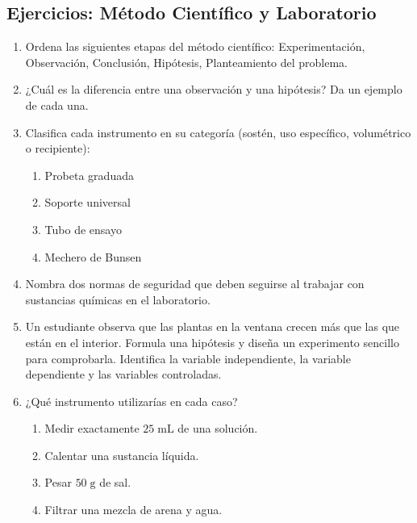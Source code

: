 \documentclass[12pt, letterpaper]{article}
\begin{document}
\newpage

\subsection{Ejercicios: Método Científico y Laboratorio}

\begin{enumerate}[leftmargin=*]
  \item \facil{} Ordena las siguientes etapas del método científico: Experimentación, Observación, Conclusión, Hipótesis, Planteamiento del problema.

  \item \facil{} ¿Cuál es la diferencia entre una observación y una hipótesis? Da un ejemplo de cada una.

  \item \facil{} Clasifica cada instrumento en su categoría (sostén, uso específico, volumétrico o recipiente):
        \begin{enumerate}[label=\alph*)]
          \item Probeta graduada
          \item Soporte universal
          \item Tubo de ensayo
          \item Mechero de Bunsen
        \end{enumerate}

  \item \facil{} Nombra dos normas de seguridad que deben seguirse al trabajar con sustancias químicas en el laboratorio.

  \item \medio{} Un estudiante observa que las plantas en la ventana crecen más que las que están en el interior. Formula una hipótesis y diseña un experimento sencillo para comprobarla. Identifica la variable independiente, la variable dependiente y las variables controladas.

  \item \medio{} ¿Qué instrumento utilizarías en cada caso?
        \begin{enumerate}[label=\alph*)]
          \item Medir exactamente $25\;\text{mL}$ de una solución.
          \item Calentar una sustancia líquida.
          \item Pesar $50\;\text{g}$ de sal.
          \item Filtrar una mezcla de arena y agua.
        \end{enumerate}


\end{enumerate}
\end{document}
